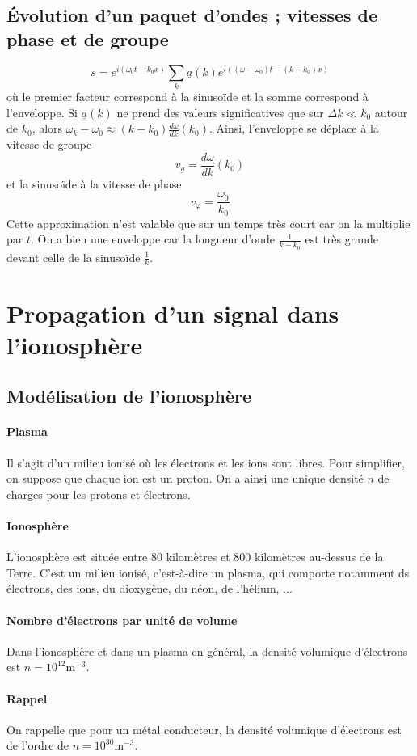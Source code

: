 \documentclass[french]{book}
\theoremstyle{plain}
\theoremstyle{definition}
\theoremstyle{remark}
\begin{document}
\subsection{Évolution d'un paquet d'ondes ; vitesses de phase et de groupe}
$$s=e^{i(\omega_0t-k_0x)}\sum_{k}\underline{a}(k)e^{i\left((\omega-\omega_0)t-(k-k_0)x\right)}$$ où le premier facteur correspond à la sinusoïde et la somme correspond à l'enveloppe. Si $\underline{a}(k)$ ne prend des valeurs significatives que sur $\Delta k\ll k_0$ autour de $k_0$, alors $\omega_k-\omega_0\approx(k-k_0)\frac{d\omega}{dk}(k_0)$. Ainsi, l'enveloppe se déplace à la vitesse de groupe $$v_g=\frac{d\omega}{dk}(k_0)$$ et la sinusoïde à la vitesse de phase $$v_\varphi=\frac{\omega_0}{k_0}$$ Cette approximation n'est valable que sur un temps très court car on la multiplie par $t$. On a bien une enveloppe car la longueur d'onde $\displaystyle\frac{1}{k-k_0}$ est très grande devant celle de la sinusoïde $\displaystyle\frac{1}{k}$.
\section{Propagation d'un signal dans l'ionosphère}
\subsection{Modélisation de l'ionosphère}
\paragraph{Plasma} Il s’agit d’un milieu ionisé où les électrons et les ions sont libres. Pour simplifier, on suppose que chaque ion est un proton. On a ainsi une unique densité $n$ de charges pour les protons et électrons.
\paragraph{Ionosphère}
L'ionosphère est située entre 80 kilomètres et 800 kilomètres au-dessus de la Terre. C'est un milieu ionisé, c'est-à-dire un plasma, qui comporte notamment ds électrons, des ions, du dioxygène, du néon, de l'hélium, ...
\paragraph{Nombre d'électrons par unité de volume} Dans l'ionosphère et dans un plasma en général, la densité volumique d'électrons est $n=10^{12}$m$^{-3}$.
\paragraph{Rappel} On rappelle que pour un métal conducteur, la densité volumique d'électrons est de l'ordre de $n=10^{30}$m$^{-3}$.
\end{document}
